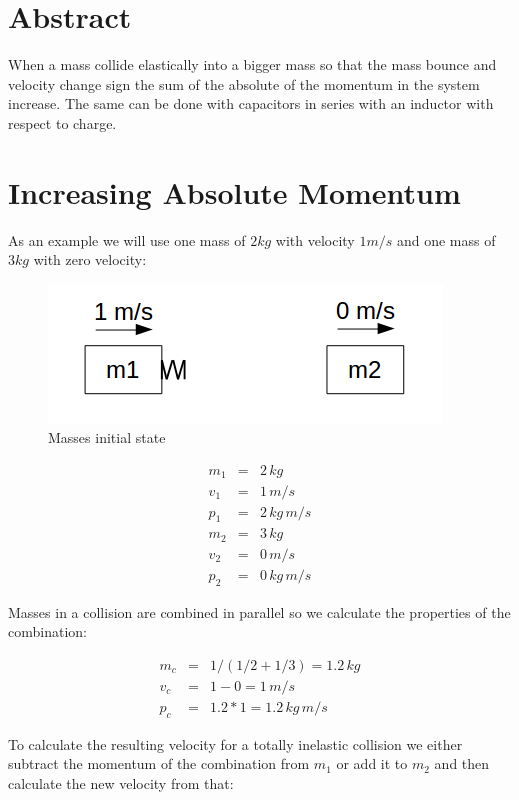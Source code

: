 
\section{Abstract}

When a mass collide elastically into a bigger mass so that the mass bounce and velocity change sign the sum of the absolute of the momentum in the system increase.
The same can be done with capacitors in series with an inductor with respect to charge.

\section{Increasing Absolute Momentum}

As an example we will use one mass of $2 kg$ with velocity $1 m/s$ and one mass of $3 kg$ with zero velocity:

\begin{figure}[ht] \centering
	\includegraphics[scale=.5]{mms4} \caption{Masses initial state}
\end{figure}

\begin{eqnarray}
m_1 &=& 2 \, kg \\
v_1 &=& 1 \, m/s \\
p_1 &=& 2 \, kg \, m/s \\
m_2 &=& 3 \, kg \\
v_2 &=& 0 \, m/s \\
p_2 &=& 0 \, kg \, m/s
\end{eqnarray}

Masses in a collision are combined in parallel\cite{masspar} so we calculate the properties of the combination:

\begin{eqnarray}
m_c &=& 1/(1/2 + 1/3) = 1.2 \, kg \\
v_c &=& 1 - 0 = 1 \, m/s \\
p_c &=& 1.2 * 1 = 1.2 \, kg \, m/s
\end{eqnarray}

To calculate the resulting velocity for a totally inelastic collision we either subtract the momentum of the combination from $m_1$ or add it to $m_2$ and then calculate the new velocity from that:

